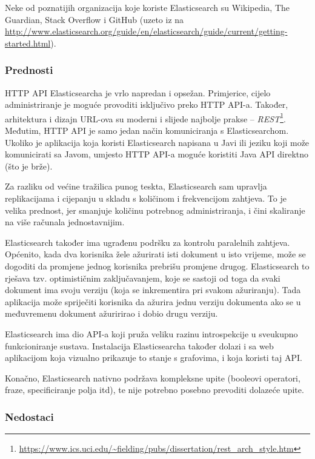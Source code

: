 \documentclass[a4paper,twoside,12pt]{scrreprt}
\begin{document}
Neke od poznatijih organizacija koje koriste Elasticsearch su Wikipedia, The Guardian, Stack Overflow i GitHub (uzeto iz \cite{elastic} na \url{http://www.elasticsearch.org/guide/en/elasticsearch/guide/current/getting-started.html}).

\subsubsection{Prednosti}

HTTP API Elasticsearcha je vrlo napredan i opsežan. Primjerice, cijelo administriranje je moguće provoditi isključivo preko HTTP API-a. Također, arhitektura i dizajn URL-ova su moderni i slijede najbolje prakse – \textit{REST}\footnote{\url{https://www.ics.uci.edu/~fielding/pubs/dissertation/rest_arch_style.htm}}. Međutim, HTTP API je samo jedan način komuniciranja s Elasticsearchom. Ukoliko je aplikacija koja koristi Elasticsearch napisana u Javi ili jeziku koji može komunicirati sa Javom, umjesto HTTP API-a moguće koristiti Java API direktno (što je brže).

Za razliku od većine tražilica punog teskta, Elasticsearch sam upravlja replikacijama i cijepanju u skladu s količinom i frekvencijom zahtjeva. To je velika prednost, jer smanjuje količinu potrebnog administriranja, i čini skaliranje na više računala jednostavnijim.

Elasticsearch također ima ugrađenu podršku za kontrolu paralelnih zahtjeva. Općenito, kada dva korisnika žele ažurirati isti dokument u isto vrijeme, može se dogoditi da promjene jednog korisnika prebrišu promjene drugog. Elasticsearch to rješava tzv. optimističnim zaključavanjem, koje se sastoji od toga da svaki dokument ima svoju verziju (koja se inkrementira pri svakom ažuriranju). Tada aplikacija može spriječiti korisnika da ažurira jednu verziju dokumenta ako se u međuvremenu dokument ažuririrao i dobio drugu verziju.

Elasticsearch ima dio API-a koji pruža veliku razinu introspekcije u sveukupno funkcioniranje sustava. Instalacija Elasticsearcha također dolazi i sa web aplikacijom koja vizualno prikazuje to stanje s grafovima, i koja koristi taj API.

Konačno, Elasticsearch nativno podržava kompleksne upite (booleovi operatori, fraze, specificiranje polja itd), te nije potrebno posebno prevoditi dolazeće upite.

\subsubsection{Nedostaci}
\end{document}
